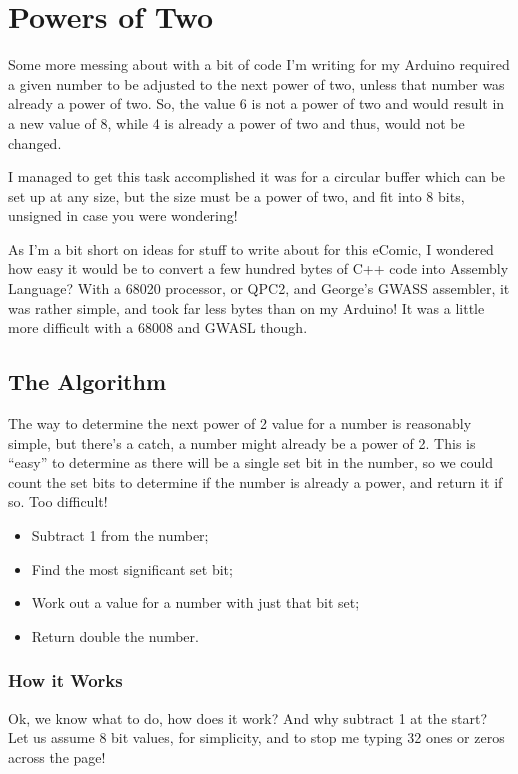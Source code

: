 \chapter{Powers of Two}

Some more messing about with a bit of code I'm writing for my Arduino
required a given number to be adjusted to the next power of two, unless
that number was already a power of two. So, the value 6 is not a power
of two and would result in a new value of 8, while 4 is already a
power of two and thus, would not be changed.

I managed to get this task accomplished \textendash{} it was for a
circular buffer which can be set up at any size, but the size must
be a power of two, and fit into 8 bits, unsigned \textendash{} in
case you were wondering!

As I'm a bit short on ideas for stuff to write about for this eComic,
I wondered how easy it would be to convert a few hundred bytes of
C++ code into Assembly Language? With a 68020 processor, or QPC2,
and George's GWASS assembler, it was rather simple, and took far less
bytes than on my Arduino! It was a little more difficult with a 68008
and GWASL though.

\section{The Algorithm}

The way to determine the next power of 2 value for a number is reasonably
simple, but there's a catch, a number might already be a power of
2. This is ``easy'' to determine as there will be a single set bit
in the number, so we could count the set bits to determine if the
number is already a power, and return it if so. Too difficult! 
\begin{itemize}
\item Subtract 1 from the number;
\item Find the most significant set bit;
\item Work out a value for a number with just that bit set;
\item Return double the number.
\end{itemize}

\subsection{How it Works}

Ok, we know what to do, how does it work? And why subtract 1 at the
start? Let us assume 8 bit values, for simplicity, and to stop me
typing 32 ones or zeros across the page!

